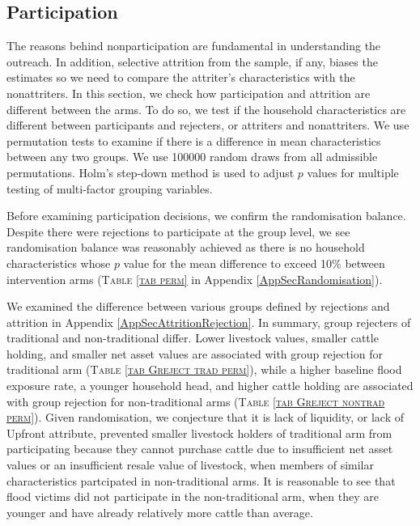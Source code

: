\subsection{Participation}
\label{ResultsSectionParticipation}

	The reasons behind nonparticipation are fundamental in understanding the outreach. In addition, selective attrition from the sample, if any, biases the estimates so we need to compare the attriter's characteristics with the nonattriters. In this section, we check how participation and attrition are different between the arms. To do so, we test if the household characteristics are different between participants and rejecters, or attriters and nonattriters. We use permutation tests to examine if there is a difference in mean characteristics between any two groups. We use 100000 random draws from all admissible permutations. Holm's step-down method is used to adjust $p$ values for multiple testing of multi-factor grouping variables.

	Before examining participation decisions, we confirm the randomisation balance. Despite there were rejections to participate at the group level, we see randomisation balance was reasonably achieved as there is no household characteristics whose $p$ value for the mean difference to exceed 10\% between intervention arms (\textsc{\normalsize Table \ref{tab perm}} in Appendix \ref{AppSecRandomisation}). %

	We examined the difference between various groups defined by rejections and attrition in Appendix \ref{AppSecAttritionRejection}. In summary, group rejecters of \textsf{traditional} and non-\textsf{traditional} differ. Lower livestock values, smaller cattle holding, and smaller net asset values are associated with group rejection for \textsf{traditional} arm (\textsc{\normalsize Table \ref{tab Greject trad perm}}), while a higher baseline flood exposure rate, a younger household head, and higher cattle holding are associated with group rejection for non-\textsf{traditional} arms (\textsc{\normalsize Table \ref{tab Greject nontrad perm}}). Given randomisation, we conjecture that it is lack of liquidity, or lack of \textsf{Upfront} attribute, prevented smaller livestock holders of \textsf{traditional} arm from participating because they cannot purchase cattle due to insufficient net asset values or an insufficient resale value of livestock, when members of similar characteristics partcipated in non-\textsf{traditional} arms. %
	It is reasonable to see that flood victims did not participate in the non-\textsf{traditional} arm, when they are younger and have already relatively more cattle than average. 

